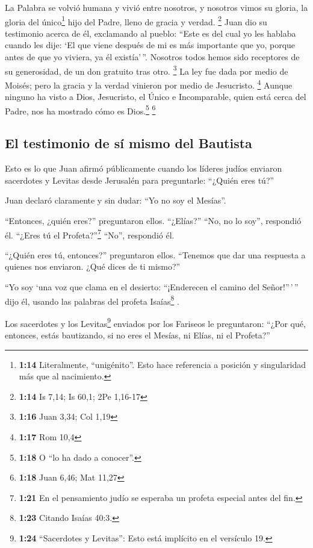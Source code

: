  La Palabra se volvió humana y vivió entre nosotros, y
nosotros vimos su gloria, la gloria del único\footnote{\textbf{1:14}
  Literalmente, ``unigénito''. Esto hace referencia a posición y
  singularidad más que al nacimiento.} hijo del Padre, lleno de gracia y
verdad. \footnote{\textbf{1:14} Is 7,14; Is 60,1; 2Pe 1,16-17}
 Juan dio su testimonio acerca de él, exclamando al
pueblo: ``Este es del cual yo les hablaba cuando les dije: `El que viene
después de mi es más importante que yo, porque antes de que yo viviera,
ya él existía'\,''.  Nosotros todos hemos sido receptores
de su generosidad, de un don gratuito tras otro. \footnote{\textbf{1:16}
  Juan 3,34; Col 1,19}  La ley fue dada por medio de
Moisés; pero la gracia y la verdad vinieron por medio de Jesucristo.
\footnote{\textbf{1:17} Rom 10,4}  Aunque ninguno ha
visto a Dios, Jesucristo, el Único e Incomparable, quien está cerca del
Padre, nos ha mostrado cómo es Dios.\footnote{\textbf{1:18} O ``lo ha
  dado a conocer''.} \footnote{\textbf{1:18} Juan 6,46; Mat 11,27}

\hypertarget{el-testimonio-de-suxed-mismo-del-bautista}{%
\subsection{El testimonio de sí mismo del
Bautista}\label{el-testimonio-de-suxed-mismo-del-bautista}}

 Esto es lo que Juan afirmó públicamente cuando los
líderes judíos enviaron sacerdotes y Levitas desde Jerusalén para
preguntarle: ``¿Quién eres tú?''

 Juan declaró claramente y sin dudar: ``Yo no soy el
Mesías''.

 ``Entonces, ¿quién eres?'' preguntaron ellos.
``¿Elías?'' ``No, no lo soy'', respondió él. ``¿Eres tú el
Profeta?''\footnote{\textbf{1:21} En el pensamiento judío se esperaba un
  profeta especial antes del fin.} ``No'', respondió él.

 ``¿Quién eres tú, entonces?'' preguntaron ellos.
``Tenemos que dar una respuesta a quienes nos enviaron. ¿Qué dices de ti
mismo?''

 ``Yo soy `una voz que clama en el desierto: ``¡Enderecen
el camino del Señor!''\,'\,'' dijo él, usando las palabras del profeta
Isaías\footnote{\textbf{1:23} Citando Isaías 40:3.} .

 Los sacerdotes y los Levitas\footnote{\textbf{1:24}
  ``Sacerdotes y Levitas'': Esto está implícito en el versículo 19.}
enviados por los Fariseos  le preguntaron: ``¿Por qué,
entonces, estás bautizando, si no eres el Mesías, ni Elías, ni el
Profeta?''


